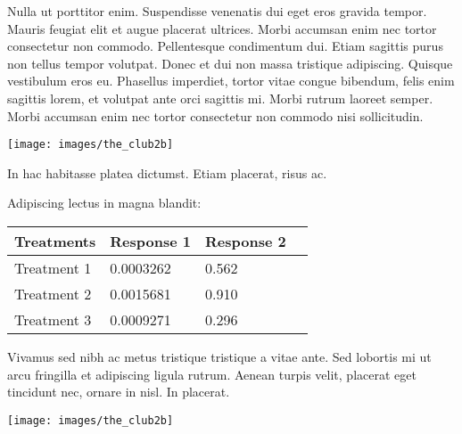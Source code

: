 \documentclass[a0,landscape]{a0poster}
\begin{document}
\begin{multicols}{4}
Nulla ut porttitor enim. Suspendisse venenatis dui eget eros gravida tempor. Mauris feugiat elit et augue placerat ultrices. Morbi accumsan enim nec tortor consectetur non commodo. Pellentesque condimentum dui. Etiam sagittis purus non tellus tempor volutpat. Donec et dui non massa tristique adipiscing. Quisque vestibulum eros eu. Phasellus imperdiet, tortor vitae congue bibendum, felis enim sagittis lorem, et volutpat ante orci sagittis mi. Morbi rutrum laoreet semper. Morbi accumsan enim nec tortor consectetur non commodo nisi sollicitudin.

\begin{center}\vspace{1cm}

\texttt{[image: images/the\_club2b]}


\end{center}\vspace{1cm}

In hac habitasse platea dictumst. Etiam placerat, risus ac.

Adipiscing lectus in magna blandit:

\begin{center}\vspace{1cm}
\begin{tabular}{l l l l}
\toprule
\textbf{Treatments} & \textbf{Response 1} & \textbf{Response 2} \\
\midrule
Treatment 1 & 0.0003262 & 0.562 \\
Treatment 2 & 0.0015681 & 0.910 \\
Treatment 3 & 0.0009271 & 0.296 \\
\bottomrule
\end{tabular}
\end{center}\vspace{1cm}

Vivamus sed nibh ac metus tristique tristique a vitae ante. Sed lobortis mi ut arcu fringilla et adipiscing ligula rutrum. Aenean turpis velit, placerat eget tincidunt nec, ornare in nisl. In placerat.

\begin{center}\vspace{1cm}
\texttt{[image: images/the\_club2b]}
\end{center}\vspace{1cm}


\end{multicols}
\end{document}
